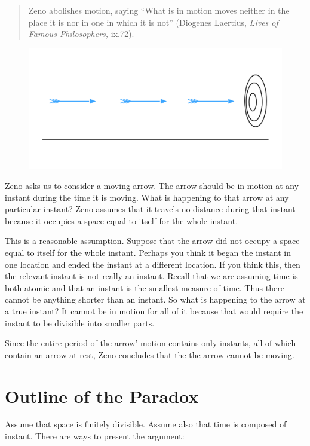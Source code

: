 \documentclass[oneside]{article}
\begin{document}
\begin{quote}
Zeno abolishes motion, saying ``What is in motion moves neither in the
place it is nor in one in which it is not'' (Diogenes Laertius, \emph{Lives of
Famous Philosophers,} ix.72).
\end{quote}


\begin{figure}[h]
  \includegraphics[width=\linewidth]{arrow.png}
\end{figure}
Zeno asks us to consider a moving arrow. The arrow should be in motion at any instant during the time it is moving. What is happening to that arrow at any particular instant? Zeno assumes that it travels no distance during that instant because it occupies a space equal to itself  for the whole instant. 

This is a reasonable assumption. Suppose that the arrow did not occupy a space equal to itself for the whole instant. Perhaps you think it began the instant in one location and ended the instant at a different location. If you think this, then the relevant instant is not really an instant. Recall that we are assuming time is both atomic and that an instant is the smallest measure of time. Thus there cannot be anything shorter than an instant. So what is happening to the arrow at a true instant? It cannot be in motion for all of it because that would require the instant to be divisible into smaller parts.   

Since the entire period of the arrow' motion contains only instants, all of which contain an arrow at rest, Zeno concludes that the the arrow cannot be moving.

\section{Outline of the Paradox}\label{outline-of-the-paradox}

Assume that space is finitely divisible. Assume also that time is composed of instant. There are ways to present the argument: 
\end{document}
